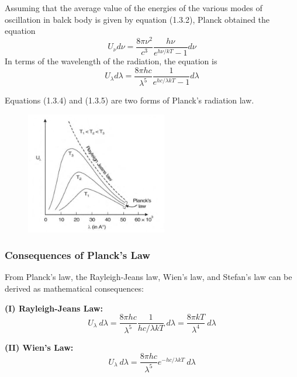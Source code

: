 \documentclass[12pt]{article}
\numberwithin{equation}{subsection}
\begin{document}
Assuming that the average value of the energies of the various modes of oscillation in balck body is given by equation (1.3.2), Planck obtained the equation
\begin{equation}
    \boxed{ U_{\nu} d\nu = \frac{8\pi\nu^2}{c^3} \frac{h\nu}{e^{h\nu/kT}-1} d\nu }
\end{equation}
In terms of the wavelength of the radiation, the equation is
\begin{equation}
    \boxed{ U_{\lambda} d\lambda = \frac{8\pi hc}{\lambda^5} \frac{1}{e^{hc/\lambda kT}-1} d\lambda }
\end{equation}

Equations (1.3.4) and (1.3.5) are two forms of Planck's radiation law.

\begin{figure}[htpb]
    \centering
    \includegraphics[width=0.55\textwidth]{planck's law.png}
\end{figure}

\subsubsection{Consequences of Planck's Law}
From Planck's law, the Rayleigh-Jeans law, Wien's law, and Stefan's law can be derived as mathematical consequences:

\textbf{(I) Rayleigh-Jeans Law:} \\
\begin{equation}
    U_{\lambda} \: d\lambda = \frac{8\pi hc}{\lambda^5} \frac{1}{hc/\lambda kT} \: d\lambda = \frac{8\pi kT}{\lambda^4} \: d\lambda
\end{equation}

\textbf{(II) Wien's Law:} \\
\begin{equation}
    U_{\lambda} \: d\lambda = \frac{8\pi hc}{\lambda^5} e^{-hc /\lambda kT} \: d\lambda
\end{equation}
\end{document}
